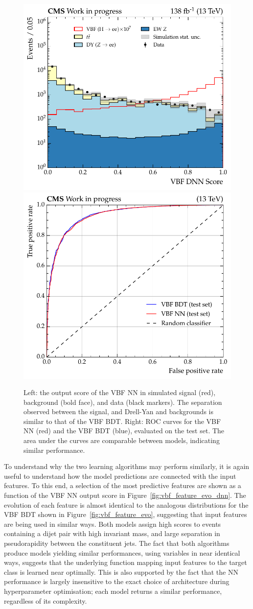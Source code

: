 \begin{figure}[htbp!]
\centering
\includegraphics[width =0.5\linewidth]{Figures/Hee/VBF/DeepLearning/performanceComparison/VBF_DNN_output_score.pdf}\hfill%
\includegraphics[width =0.5\linewidth]{Figures/Hee/VBF/DeepLearning/performanceComparison/VBF_BDT_vs_DNN_ROC.pdf}\hfill%
\caption[The output score of the VBF LSTM neural network.]{Left: the output score of the VBF NN in simulated signal (red), background (bold face), and data (black markers). The separation observed between the signal, and Drell-Yan and \ttbar backgrounds is similar to that of the VBF BDT. Right: ROC curves for the VBF NN (red) and the VBF BDT (blue), evaluated on the test set. The area under the curves are comparable between models, indicating similar performance.}
\label{fig:vbf_nn_vs_bdt}
\end{figure}

To understand why the two learning algorithms may perform similarly, it is again useful to understand how the model predictions are connected with the input features. To this end, a selection of the most predictive features are shown as a function of the VBF NN output score in Figure~\ref{fig:vbf_feature_evo_dnn}. The evolution of each feature is almost identical to the analogous distributions for the VBF BDT shown in Figure~\ref{fig:vbf_feature_evo}, suggesting that input features are being used in similar ways. Both models assign high scores to events containing a dijet pair with high invariant mass, and large separation in pseudorapidity between the constituent jets. The fact that both algorithms produce models yielding similar performances, using variables in near identical ways, suggests that the underlying function mapping input features to the target class is learned near optimally. This is also supported by the fact that the NN performance is largely insensitive to the exact choice of architecture during hyperparameter optimisation; each model returns a similar performance, regardless of its complexity.


